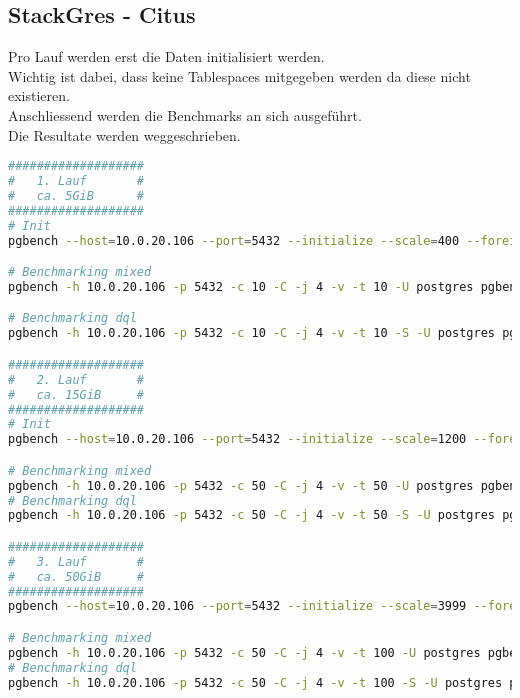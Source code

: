 
\begin{flushleft}
    \subsection{StackGres - Citus}
    \label{subsec:stackgres_citus_benchmarking_commands}
    Pro Lauf werden erst die Daten initialisiert werden.\\
    Wichtig ist dabei, dass keine Tablespaces mitgegeben werden da diese nicht existieren.\\
    Anschliessend werden die Benchmarks an sich ausgeführt.\\
    Die Resultate werden weggeschrieben.
\lstset{style=gra_codestyle}
\begin{lstlisting}[language=bash, caption=StackGres-Citus - Benchmarking-Commands,captionpos=b,label={lst:stackgres_citus-benchmarking-commands},breaklines=true]
###################
#   1. Lauf       #
#   ca. 5GiB      #
###################
# Init
pgbench --host=10.0.20.106 --port=5432 --initialize --scale=400 --foreign-keys --fillfactor=100 --username=dtgvpf  --username=postgres pgbench_eval_bench

# Benchmarking mixed
pgbench -h 10.0.20.106 -p 5432 -c 10 -C -j 4 -v -t 10 -U postgres pgbench_eval_bench > /home/itgramic/1_1_stackgresmixed_benchmark.txt

# Benchmarking dql
pgbench -h 10.0.20.106 -p 5432 -c 10 -C -j 4 -v -t 10 -S -U postgres pgbench_eval_bench > /home/itgramic/1_1_stackgresdql_benchmark.txt

###################
#   2. Lauf       #
#   ca. 15GiB     #
###################
# Init
pgbench --host=10.0.20.106 --port=5432 --initialize --scale=1200 --foreign-keys --fillfactor=100 --username=dtgvpf  --username=postgres pgbench_eval_bench

# Benchmarking mixed
pgbench -h 10.0.20.106 -p 5432 -c 50 -C -j 4 -v -t 50 -U postgres pgbench_eval_bench > /home/itgramic/2_1_stackgres_mixed_benchmark.txt
# Benchmarking dql
pgbench -h 10.0.20.106 -p 5432 -c 50 -C -j 4 -v -t 50 -S -U postgres pgbench_eval_bench > /home/itgramic/2_1_stackgres_dql_benchmark.txt

###################
#   3. Lauf       #
#   ca. 50GiB     #
###################
pgbench --host=10.0.20.106 --port=5432 --initialize --scale=3999 --foreign-keys --fillfactor=100 --username=dtgvpf  --username=postgres pgbench_eval_bench

# Benchmarking mixed
pgbench -h 10.0.20.106 -p 5432 -c 50 -C -j 4 -v -t 100 -U postgres pgbench_eval_bench > /home/itgramic/3_1_stackgres_mixed_benchmark.txt
# Benchmarking dql
pgbench -h 10.0.20.106 -p 5432 -c 50 -C -j 4 -v -t 100 -S -U postgres pgbench_eval_bench > /home/itgramic/3_1_stackgres_dql_benchmark.txt



\end{lstlisting}
\end{flushleft}
